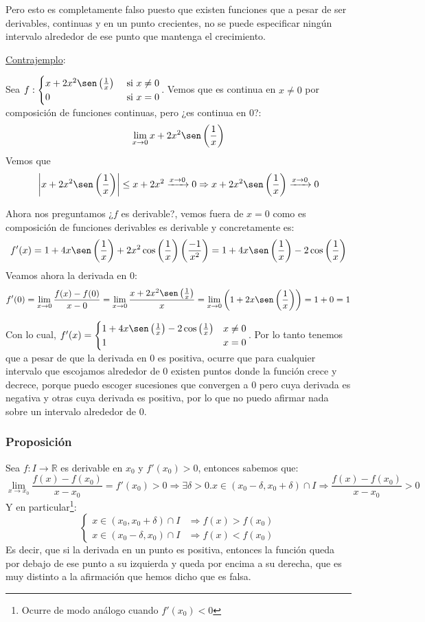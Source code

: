 \documentclass[10pt,a4paper,openright]{book}
\begin{document}
Pero esto es completamente falso puesto que existen funciones que a pesar de ser derivables, continuas y en un punto crecientes, no se puede especificar ningún intervalo alrededor de ese punto que mantenga el crecimiento.

\underline{Contrajemplo}:

Sea $f:\begin{cases}x+2x^2 \sen\left(\frac{1}{x}\right) & \mbox{ si }x\neq 0\\ 0 &\mbox{ si }x=0 \end{cases}$. Vemos que es continua en $x\neq 0$ por composición de funciones continuas, pero ¿es continua en 0?:
$$\lim_{x\rightarrow 0} x+2x^2 \sen\left(\frac{1}{x}\right)$$
Vemos que
$$\left|x+2x^2 \sen\left(\frac{1}{x}\right)\right|\leq x+2x^2\xrightarrow{x\rightarrow 0} 0\Rightarrow x+2x^2 \sen\left(\frac{1}{x}\right)\xrightarrow{x\rightarrow 0}0$$ 

Ahora nos preguntamos ¿$f$ es derivable?, vemos fuera de $x=0$ como es composición de funciones derivables es derivable y concretamente es:
$$f'(x)=1+4x\sen\left(\frac{1}{x}\right)+2x^2\cos\left(\frac{1}{x}\right)\left(\frac{-1}{x^2}\right)=1+4x\sen\left(\frac{1}{x}\right)-2\cos\left(\frac{1}{x}\right)$$
Veamos ahora la derivada en 0:
$$f'(0)=\lim_{x\rightarrow 0}\frac{f(x)-f(0)}{x-0}=\lim_{x\rightarrow 0}\frac{x+2x^2\sen\left(\frac{1}{x}\right)}{x}=\lim_{x\rightarrow 0 }\left(1+2x\sen\left(\frac{1}{x}\right)\right)=1+0=1$$

Con lo cual, $f'(x)=\begin{cases}1+4x\sen\left(\frac{1}{x}\right)-2\cos\left(\frac{1}{x}\right) & x\neq 0\\ 1 & x=0\end{cases}$. Por lo tanto tenemos que a pesar de que la derivada en 0 es positiva, ocurre que para cualquier intervalo que escojamos alrededor de $0$ existen puntos donde la función crece y decrece, porque puedo escoger sucesiones que convergen a 0 pero cuya derivada es negativa y otras cuya derivada es positiva, por lo que no puedo afirmar nada sobre un intervalo alrededor de 0.

\subsubsection*{Proposición}
Sea $f:I\rightarrow\mathbb R$ es derivable en $x_0$ y $f'(x_0)>0$, entonces sabemos que:
$$\lim_{x\rightarrow x_0}\frac{f(x)-f(x_0)}{x-x_0}=f'(x_0)>0\Rightarrow \exists \delta>0. x\in (x_0-\delta, x_0+\delta)\cap I\Rightarrow \frac{f(x)-f(x_0)}{x-x_0}>0$$
Y en particular\footnote{Ocurre de modo análogo cuando $f'(x_0)<0$}:
$$\begin{cases} x\in (x_0,x_0+\delta)\cap I &\Rightarrow f(x)>f(x_0)\\
x\in (x_0-\delta,x_0)\cap I & \Rightarrow f(x)<f(x_0)\end{cases}$$
Es decir, que si la derivada en un punto es positiva, entonces la función queda por debajo de ese punto a su izquierda y queda por encima a su derecha, que es muy distinto a la afirmación que hemos dicho que es falsa.
\end{document}
